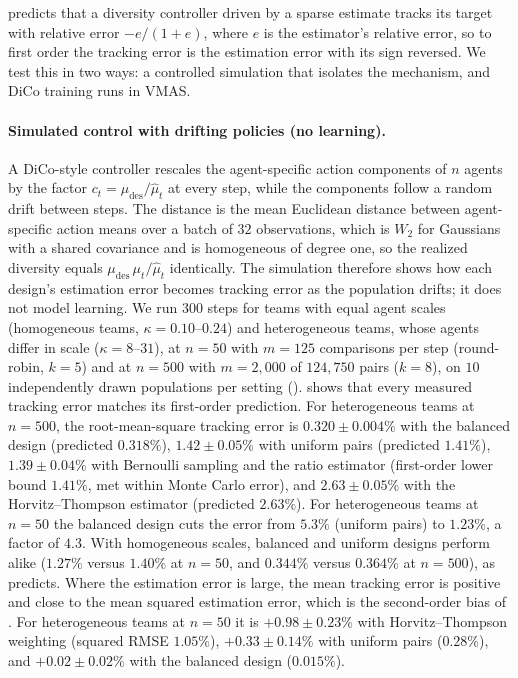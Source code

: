 \documentclass[twoside,11pt]{article}
\newcommand{\SNDdes}{\mu_{\mathrm{des}}}
\begin{document}
 predicts that a diversity controller driven by a sparse
estimate tracks its target with relative error $-e/(1+e)$, where $e$ is the
estimator's relative error, so to first order the tracking error is the
estimation error with its sign reversed. We
test this in two ways: a controlled simulation that isolates the
mechanism, and DiCo training runs in VMAS.

\paragraph{Simulated control with drifting policies (no learning).}
A DiCo-style controller rescales the agent-specific action components of
$n$ agents by the factor $c_t=\SNDdes/\widehat\mu_t$ at every step, while the components
follow a random drift between steps. The distance is the mean Euclidean
distance between agent-specific action means over a batch of $32$
observations, which is $W_2$ for Gaussians with a shared covariance and is
homogeneous of degree one, so the realized diversity equals
$\SNDdes\,\mu_t/\widehat\mu_t$ identically. The simulation therefore shows
how each design's estimation error becomes tracking error as the population
drifts; it does not model learning. We run $300$ steps for teams with
equal agent scales (homogeneous teams, $\kappa=0.10$--$0.24$) and heterogeneous teams, whose agents differ
in scale ($\kappa=8$--$31$), at $n=50$ with $m=125$ comparisons per step
(round-robin, $k=5$) and at $n=500$ with $m=2{,}000$ of $124{,}750$ pairs
($k=8$), on $10$ independently drawn populations per setting
().
 shows that every measured tracking error matches its
first-order prediction. For heterogeneous teams at $n=500$, the
root-mean-square tracking error is $0.320\pm0.004\%$ with the balanced
design (predicted $0.318\%$), $1.42\pm0.05\%$ with uniform pairs (predicted
$1.41\%$), $1.39\pm0.04\%$ with Bernoulli sampling and the ratio estimator (first-order
lower bound $1.41\%$, met within Monte Carlo error),
and $2.63\pm0.05\%$ with the Horvitz--Thompson estimator (predicted
$2.63\%$). For heterogeneous teams at $n=50$ the balanced design cuts the error from $5.3\%$ (uniform pairs) to
$1.23\%$, a factor of $4.3$. With homogeneous scales, balanced and uniform
designs perform alike ($1.27\%$ versus $1.40\%$ at $n=50$, and $0.344\%$
versus $0.364\%$ at $n=500$), as  predicts. Where the
estimation error is large, the mean tracking error is positive and close to
the mean squared estimation error, which is the second-order bias of
. For heterogeneous teams
at $n=50$ it is ${+0.98\pm0.23\%}$ with Horvitz--Thompson weighting (squared
RMSE $1.05\%$), ${+0.33\pm0.14\%}$ with uniform pairs ($0.28\%$), and
$+0.02\pm0.02\%$ with the balanced design ($0.015\%$).
\end{document}
